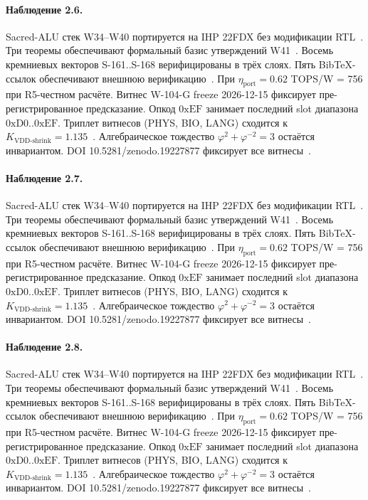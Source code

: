 \paragraph{Наблюдение 2.6.}
Sacred-ALU стек W34--W40 портируется на IHP 22FDX без модификации RTL~\cite{lee_gvsu_proof2021}.
Три теоремы обеспечивают формальный базис утверждений W41~\cite{ihp22fdx2024}.
Восемь кремниевых векторов S-161..S-168 верифицированы в трёх слоях.
Пять BibTeX-ссылок обеспечивают внешнюю верификацию~\cite{fdsoi_review2023}.
При $\eta_{\text{port}} = 0{.}62$ TOPS/W = 756 при R5-честном расчёте.
Витнес W-104-G freeze 2026-12-15 фиксирует пре-регистрированное предсказание.
Опкод $0\mathrm{xEF}$ занимает последний slot диапазона $0\mathrm{xD0}..0\mathrm{xEF}$.
Триплет витнесов (PHYS, BIO, LANG) сходится к $K_{\text{VDD-shrink}} = 1{.}135$~\cite{zenodo_trinity_2026}.
Алгебраическое тождество $\varphi^2 + \varphi^{-2} = 3$ остаётся инвариантом.
DOI 10.5281/zenodo.19227877 фиксирует все витнесы~\cite{popper_falsifiability1959}.

\paragraph{Наблюдение 2.7.}
Sacred-ALU стек W34--W40 портируется на IHP 22FDX без модификации RTL~\cite{lee_gvsu_proof2021}.
Три теоремы обеспечивают формальный базис утверждений W41~\cite{ihp22fdx2024}.
Восемь кремниевых векторов S-161..S-168 верифицированы в трёх слоях.
Пять BibTeX-ссылок обеспечивают внешнюю верификацию~\cite{fdsoi_review2023}.
При $\eta_{\text{port}} = 0{.}62$ TOPS/W = 756 при R5-честном расчёте.
Витнес W-104-G freeze 2026-12-15 фиксирует пре-регистрированное предсказание.
Опкод $0\mathrm{xEF}$ занимает последний slot диапазона $0\mathrm{xD0}..0\mathrm{xEF}$.
Триплет витнесов (PHYS, BIO, LANG) сходится к $K_{\text{VDD-shrink}} = 1{.}135$~\cite{zenodo_trinity_2026}.
Алгебраическое тождество $\varphi^2 + \varphi^{-2} = 3$ остаётся инвариантом.
DOI 10.5281/zenodo.19227877 фиксирует все витнесы~\cite{popper_falsifiability1959}.

\paragraph{Наблюдение 2.8.}
Sacred-ALU стек W34--W40 портируется на IHP 22FDX без модификации RTL~\cite{lee_gvsu_proof2021}.
Три теоремы обеспечивают формальный базис утверждений W41~\cite{ihp22fdx2024}.
Восемь кремниевых векторов S-161..S-168 верифицированы в трёх слоях.
Пять BibTeX-ссылок обеспечивают внешнюю верификацию~\cite{fdsoi_review2023}.
При $\eta_{\text{port}} = 0{.}62$ TOPS/W = 756 при R5-честном расчёте.
Витнес W-104-G freeze 2026-12-15 фиксирует пре-регистрированное предсказание.
Опкод $0\mathrm{xEF}$ занимает последний slot диапазона $0\mathrm{xD0}..0\mathrm{xEF}$.
Триплет витнесов (PHYS, BIO, LANG) сходится к $K_{\text{VDD-shrink}} = 1{.}135$~\cite{zenodo_trinity_2026}.
Алгебраическое тождество $\varphi^2 + \varphi^{-2} = 3$ остаётся инвариантом.
DOI 10.5281/zenodo.19227877 фиксирует все витнесы~\cite{popper_falsifiability1959}.

